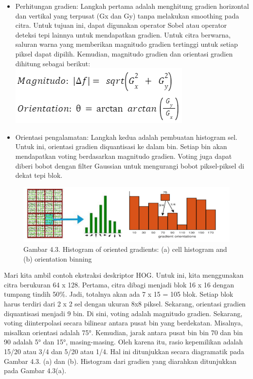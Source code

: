 \documentclass[
  letterpaper,
  DIV=11,
  numbers=noendperiod]{scrreprt}
\providecommand{\tightlist}{%
  \setlength{\itemsep}{0pt}\setlength{\parskip}{0pt}}\usepackage{longtable,booktabs,array}
\begin{document}
\begin{itemize}
\tightlist
\item
  Perhitungan gradien: Langkah pertama adalah menghitung gradien
  horizontal dan vertikal yang terpusat (Gx dan Gy) tanpa melakukan
  smoothing pada citra. Untuk tujuan ini, dapat digunakan operator Sobel
  atau operator deteksi tepi lainnya untuk mendapatkan gradien. Untuk
  citra berwarna, saluran warna yang memberikan magnitudo gradien
  tertinggi untuk setiap piksel dapat dipilih. Kemudian, magnitudo
  gradien dan orientasi gradien dihitung sebagai berikut:\\

  \includegraphics{Asset/image14.png}
\item
  Orientasi pengalamatan: Langkah kedua adalah pembuatan histogram sel.
  Untuk ini, orientasi gradien diquantisasi ke dalam bin. Setiap bin
  akan mendapatkan voting berdasarkan magnitudo gradien. Voting juga
  dapat diberi bobot dengan filter Gaussian untuk mengurangi bobot
  piksel-piksel di dekat tepi blok.
\end{itemize}

\begin{figure}

{\centering \includegraphics{Asset/image15.png}

}

\caption{Gambar 4.3. Histogram of oriented gradients: (a) cell histogram
and (b) orientation binning}

\end{figure}

Mari kita ambil contoh ekstraksi deskriptor HOG. Untuk ini, kita
menggunakan citra berukuran 64 x 128. Pertama, citra dibagi menjadi blok
16 x 16 dengan tumpang tindih 50\%. Jadi, totalnya akan ada 7 x 15 = 105
blok. Setiap blok harus terdiri dari 2 x 2 sel dengan ukuran 8x8 piksel.
Sekarang, orientasi gradien diquantisasi menjadi 9 bin. Di sini, voting
adalah magnitudo gradien. Sekarang, voting diinterpolasi secara bilinear
antara pusat bin yang berdekatan. Misalnya, misalkan orientasi adalah
75°. Kemudian, jarak antara pusat bin bin 70 dan bin 90 adalah 5° dan
15°, masing-masing. Oleh karena itu, rasio kepemilikan adalah 15/20 atau
3/4 dan 5/20 atau 1/4. Hal ini ditunjukkan secara diagramatik pada
Gambar 4.3. (a) dan (b). Histogram dari gradien yang diarahkan
ditunjukkan pada Gambar 4.3(a).
\end{document}

